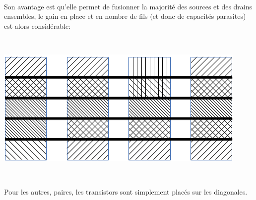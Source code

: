 \documentclass{article}
\begin{document}
\begin{multicols}{2}
    ~

    Son avantage est qu’elle permet de fusionner la majorité des sources et des drains ensembles, le gain en place et en nombre de fils (et donc de capacités parasites) est alors considérable:

    ~

    \includegraphics[width=\linewidth-1cm]{placement_mirroirs_final2.png}

    ~

    Pour les autres, paires, les transistors sont simplement placés sur les diagonales.

\end{multicols}






\end{document}
